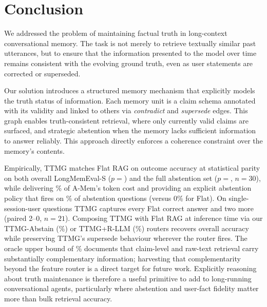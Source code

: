 \section{Conclusion}

We addressed the problem of maintaining factual truth in long-context
conversational memory. The task is not merely to retrieve textually
similar past utterances, but to ensure that the information presented
to the model over time remains consistent with the evolving ground
truth, even as user statements are corrected or superseded.

Our solution introduces a structured memory mechanism that explicitly
models the truth status of information. Each memory unit is a claim
schema annotated with its validity and linked to others via
\textit{contradict} and \textit{supersede} edges. This graph enables
truth-consistent retrieval, where only currently valid claims are
surfaced, and strategic abstention when the memory lacks sufficient
information to answer reliably. This approach directly enforces a
coherence constraint over the memory's contents.

Empirically, TTMG matches Flat RAG on outcome accuracy at
statistical parity on both overall LongMemEval-S
($p{=}$\McnemarOverall) and the full abstention set
($p{=}$\McnemarABSFull, $n{=}30$), while delivering
\TokensOverhead\% of A-Mem's token cost and providing an explicit
abstention policy that fires on
\TTMGABSFullAbstainRate\% of abstention questions (versus 0\% for
Flat). On single-session-user questions TTMG captures every Flat
correct answer and two more (paired 2--0, $n{=}21$). Composing TTMG
with Flat RAG at inference time via our TTMG-Abstain
(\AbstainRouterAcc\%) or TTMG+R-LLM (\LLMRouterAcc\%) routers
recovers overall accuracy while preserving TTMG's supersede
behaviour wherever the router fires. The oracle upper bound of \OracleLMEAcc\% documents
that claim-level and raw-text retrieval carry substantially
complementary information; harvesting
that complementarity beyond the feature router is a direct target for
future work. Explicitly reasoning about truth maintenance is therefore
a useful primitive to add to long-running conversational agents,
particularly where abstention and user-fact fidelity matter more than
bulk retrieval accuracy.
